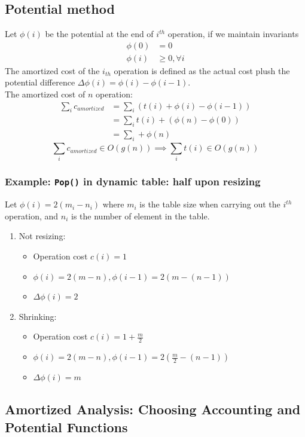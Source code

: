 \documentclass[9pt]{extarticle}
\begin{document}
\subsection{Potential method}
Let $\phi(i)$ be the potential at the end of $i^{th}$ operation, if we maintain invariants
\begin{align*}
  \phi(0) &= 0\\
  \phi(i) &\geq 0, \forall i
\end{align*}
The amortized cost of the $i_{th}$ operation is defined as the actual cost plush the potential 
difference $\Delta \phi(i) = \phi(i) - \phi(i-1)$. \\
The amortized cost of $n$ operation:
\begin{align*}
  \sum_{i} c_{amortized} &= \sum_{i} (t(i) + \phi(i) - \phi(i-1))\\
  &= \sum_{i} t(i) + (\phi(n) - \phi(0))\\
  &= \sum_{i} + \phi(n) 
\end{align*}
\[\sum_{i} c_{amortized} \in O(g(n)) \implies \sum_{i} t(i) \in O(g(n))\]
\subsubsection*{Example: \texttt{Pop()} in dynamic table: half upon resizing} 
Let $\phi(i) = 2(m_i - n_i)$ where $m_i$ is the table size when carrying out the $i^{th}$ operation, and $n_i$ is the number of element in the table. 
\begin{enumerate}
  \item Not resizing:
  \begin{itemize}
    \item Operation cost $c(i) = 1$
    \item $\phi(i) = 2(m - n), \phi(i - 1) = 2(m - (n - 1))$
    \item $\Delta\phi(i) = 2$
  \end{itemize}
  \item Shrinking:
  \begin{itemize}
    \item Operation cost $c(i) = 1 + \frac{m}{2}$
    \item $\phi(i) = 2(m - n), \phi(i - 1) = 2(\frac{m}{2} - (n-1))$
    \item $\Delta \phi(i) = m $
  \end{itemize}
\end{enumerate}
\subsection{Amortized Analysis: Choosing Accounting and Potential Functions}
\end{document}
